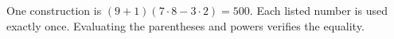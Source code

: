 One construction is $\boxed{(9+1)(7\cdot8-3\cdot2)=500}$. Each listed number is used exactly once. Evaluating the parentheses and powers verifies the equality.
